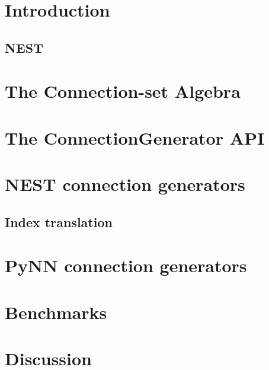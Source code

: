 \documentclass[a4paper]{article}
\begin{document}
\section{Introduction}


\subsection{NEST}






\section{The Connection-set Algebra}




\section{The ConnectionGenerator API}



\section{NEST connection generators}


\subsection{Index translation}

\section{PyNN connection generators}


\section{Benchmarks}


\section{Discussion}



\end{document}
